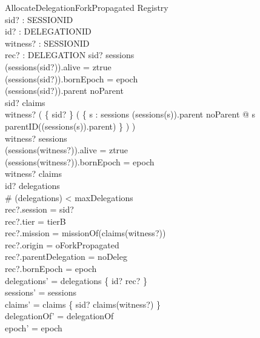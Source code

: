 \documentclass[a4paper,10pt,fleqn]{article}
\begin{document}
\begin{schema}{AllocateDelegationForkPropagated}
\Delta Registry \\
sid? : SESSIONID \\
id? : DELEGATIONID \\
witness? : SESSIONID \\
rec? : DELEGATION
\where
sid? \in \dom sessions \\
(sessions(sid?)).alive = ztrue \\
(sessions(sid?)).bornEpoch = epoch \\
(sessions(sid?)).parent \neq noParent \\
sid? \notin \dom claims \\
witness? \in \ran ( \{ sid? \} \dres
  ( \{ s : \dom sessions \mid (sessions(s)).parent \neq noParent @
       s \mapsto parentID((sessions(s)).parent) \} \plus ) ) \\
witness? \in \dom sessions \\
(sessions(witness?)).alive = ztrue \\
(sessions(witness?)).bornEpoch = epoch \\
witness? \in \dom claims \\
id? \notin \dom delegations \\
\# (\dom delegations) < maxDelegations \\
rec?.session = sid? \\
rec?.tier = tierB \\
rec?.mission = missionOf(claims(witness?)) \\
rec?.origin = oForkPropagated \\
rec?.parentDelegation = noDeleg \\
rec?.bornEpoch = epoch \\
delegations' = delegations \oplus \{ id? \mapsto rec? \} \\
sessions' = sessions \\
claims' = claims \oplus \{ sid? \mapsto claims(witness?) \} \\
delegationOf' = delegationOf \\
epoch' = epoch
\end{schema}
\end{document}
